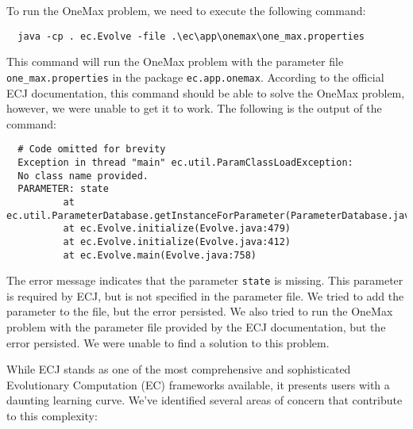 To run the OneMax problem, we need to execute the following command:

\begin{verbatim}
  java -cp . ec.Evolve -file .\ec\app\onemax\one_max.properties  
\end{verbatim}

This command will run the OneMax problem with the parameter file \texttt{one\_max.properties} in the package \texttt{ec.app.onemax}.
According to the official ECJ documentation, this command should be able to solve the OneMax problem, however, we were unable to get it to work. The following is the output of the command:

\begin{verbatim}
  # Code omitted for brevity
  Exception in thread "main" ec.util.ParamClassLoadException:
  No class name provided.
  PARAMETER: state
          at ec.util.ParameterDatabase.getInstanceForParameter(ParameterDatabase.java:493)
          at ec.Evolve.initialize(Evolve.java:479)
          at ec.Evolve.initialize(Evolve.java:412)
          at ec.Evolve.main(Evolve.java:758)
\end{verbatim}

The error message indicates that the parameter \texttt{state} is missing. This parameter is required by ECJ, but is not specified in the parameter file. We tried to add the parameter to the file, but the error persisted. We also tried to run the OneMax problem with the parameter file provided by the ECJ documentation, but the error persisted. We were unable to find a solution to this problem.

While ECJ stands as one of the most comprehensive and sophisticated Evolutionary Computation (EC) frameworks available, it presents users with a daunting learning curve. We've identified several areas of concern that contribute to this complexity:

